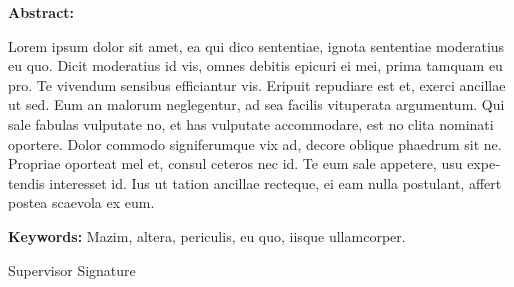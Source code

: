 \begin{latin}

\thispagestyle{empty}

{\fontsize{13}{16}\selectfont\textbf{Abstract:}}

\vspace{24pt}

{\fontsize{12}{15}\selectfont
Lorem ipsum dolor sit amet, ea qui dico sententiae, ignota sententiae moderatius eu quo. Dicit moderatius id vis, omnes debitis epicuri ei mei, prima tamquam eu pro. Te vivendum sensibus efficiantur vis. Eripuit repudiare est et, exerci ancillae ut sed. Eum an malorum neglegentur, ad sea facilis vituperata argumentum. Qui sale fabulas vulputate no, et has vulputate accommodare, est no clita nominati oportere.
Dolor commodo signiferumque vix ad, decore oblique phaedrum sit ne. Propriae oporteat mel et, consul ceteros nec id. Te eum sale appetere, usu expetendis interesset id. Ius ut tation ancillae recteque, ei eam nulla postulant, affert postea scaevola ex eum.
}

\vspace{18pt}

{\fontsize{12}{15}\selectfont\textbf{Keywords:}}
{\fontsize{12}{15}\selectfont
Mazim, altera, periculis, eu quo, iisque ullamcorper.
}

\vfill

\begin{flushright}
{\fontsize{12}{14}\selectfont
Supervisor Signature
}
\end{flushright}

\end{latin}
